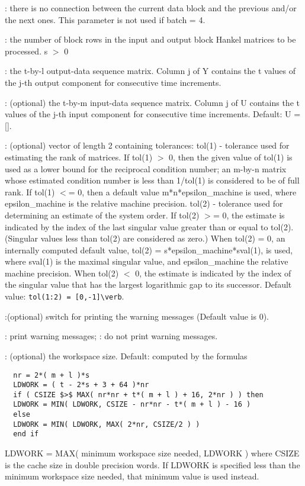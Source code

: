 \begin{parameters}
\begin{varlist}
\begin{varlist}
      : there is no connection between the current data block and the
      previous and/or the next ones.  This parameter is not used if batch = 4.
    \end{varlist}
    : the number of block rows in the input and output block Hankel
    matrices to be processed.  s $>$ 0

    : the t-by-l output-data sequence matrix.  Column j of Y contains
    the t values of the j-th output component for consecutive time increments.

    : (optional) the t-by-m input-data sequence matrix.  Column j of U
    contains the t values of the j-th input component for consecutive time
    increments. Default: U = [].

    : (optional) vector of length 2 containing tolerances: tol(1) -
    tolerance used for estimating the rank of matrices. If tol(1) $>$ 0, then
    the given value of tol(1) is used as a lower bound for the reciprocal
    condition number; an m-by-n matrix whose estimated condition number is less
    than 1/tol(1) is considered to be of full rank. If tol(1) $<$= 0, then a
    default value m*n*epsilon\_machine is used, where epsilon\_machine is the
    relative machine precision.  tol(2) - tolerance used for determining an
    estimate of the system order. If tol(2) $>$= 0, the estimate is indicated by
    the index of the last singular value greater than or equal to tol(2).
    (Singular values less than tol(2) are considered as zero.) When tol(2) = 0,
    an internally computed default value, tol(2) = s*epsilon\_machine*sval(1),
    is used, where sval(1) is the maximal singular value, and epsilon\_machine
    the relative machine precision. When tol(2) $<$ 0, the estimate is indicated
    by the index of the singular value that has the largest logarithmic gap to
    its successor. Default value: \verb!tol(1:2) = [0,-1]\verb!.

    :(optional) switch for printing the warning messages  (Default value is 0).
    \begin{varlist}
      :  print warning messages;
      :  do not print warning messages.
    \end{varlist}
    : (optional) the workspace size. Default: computed by the formulas
\begin{verbatim}
  nr = 2*( m + l )*s
  LDWORK = ( t - 2*s + 3 + 64 )*nr
  if ( CSIZE $>$ MAX( nr*nr + t*( m + l ) + 16, 2*nr ) ) then
  LDWORK = MIN( LDWORK, CSIZE - nr*nr - t*( m + l ) - 16 )
  else
  LDWORK = MIN( LDWORK, MAX( 2*nr, CSIZE/2 ) )
  end if
\end{verbatim}
    LDWORK = MAX( minimum workspace size needed, LDWORK ) where CSIZE is the cache size in double precision words.
    If LDWORK is specified less than the minimum workspace size  needed, that minimum value is used instead.
    

\end{varlist}
\end{parameters}
